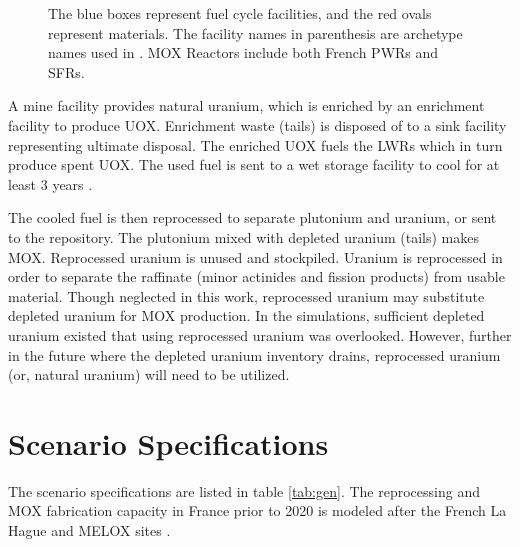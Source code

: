 \begin{figure}
{\begin{tikzpicture}[align=center, node distance = 3cm and 3cm, auto]
                \end{tikzpicture}
        
                }
                \caption{The blue boxes represent fuel cycle facilities, and the red ovals
                         represent materials. The facility names in parenthesis are archetype names
                         used in \Cyclus. \gls{MOX} Reactors include both French \glspl{PWR} and
                         \glspl{SFR}.}
                \label{diag:fc}
\end{figure}

A mine facility provides natural uranium, which is enriched by an enrichment
facility to produce \gls{UOX}. Enrichment waste (tails) is disposed of to a 
sink facility representing ultimate disposal. The enriched \gls{UOX} fuels
the \glspl{LWR} which in turn produce spent \gls{UOX}. The used fuel
is sent to a wet storage facility to cool for at least 3 years \cite{carre_overview_2009}.

The cooled fuel is then reprocessed to separate plutonium and uranium,
or sent to the repository.
The plutonium mixed with depleted uranium (tails) makes \gls{MOX}.
Reprocessed uranium is unused and stockpiled. Uranium is reprocessed
in order to separate the raffinate (minor actinides and fission products)
from usable material. Though neglected in this work, reprocessed
uranium may substitute depleted uranium for \gls{MOX} production. In the
simulations, sufficient depleted uranium existed that using reprocessed
uranium was overlooked. However, further in the future where the depleted
uranium inventory drains, reprocessed uranium (or, natural uranium) will need to be utilized. 

\FloatBarrier

\section{Scenario Specifications}

The scenario specifications  are listed in table \ref{tab:gen}.
The reprocessing and \gls{MOX} fabrication capacity in France
prior to 2020 is modeled after the 
French La Hague and MELOX sites \cite{schneider_spent_2008, hugelmann_melox_1999}.


